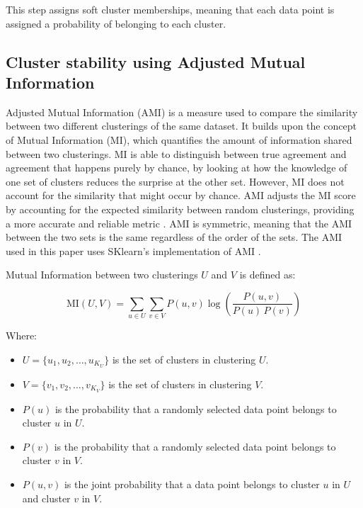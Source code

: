 \documentclass{article}
\begin{document}
This step assigns soft cluster memberships, meaning that each data point is assigned a probability of belonging to each cluster.


\subsection*{Cluster stability using  Adjusted Mutual Information}

Adjusted Mutual Information (AMI) is a measure used to compare the similarity between two different clusterings of the same dataset. It builds upon the concept of Mutual Information (MI), which quantifies the amount of information shared between two clusterings. MI is able to distinguish between true agreement and agreement that happens purely by chance, by looking at how the knowledge of one set of clusters reduces the surprise at the other set.
However, MI does not account for the similarity that might occur by chance. AMI adjusts the MI score by accounting for the expected similarity between random clusterings, providing a more accurate and reliable metric \cite{JMLR:v11:vinh10a}. 
AMI is symmetric, meaning that the AMI between the two sets is the same regardless of the order of the sets. The AMI used in this paper uses SKlearn's implementation of AMI \cite{Adjusted_mutual_info_score}.

Mutual Information between two clusterings \( U \) and \( V \) is defined as:

\[
\text{MI}(U, V) = \sum_{u \in U} \sum_{v \in V} P(u, v) \log \left( \frac{P(u, v)}{P(u) \, P(v)} \right)
\]

Where:
\begin{itemize}
    \item \( U = \{u_1, u_2, \dots, u_{K_U}\} \) is the set of clusters in clustering \( U \).
    \item \( V = \{v_1, v_2, \dots, v_{K_V}\} \) is the set of clusters in clustering \( V \).
    \item \( P(u) \) is the probability that a randomly selected data point belongs to cluster \( u \) in \( U \).
    \item \( P(v) \) is the probability that a randomly selected data point belongs to cluster \( v \) in \( V \).
    \item \( P(u, v) \) is the joint probability that a data point belongs to cluster \( u \) in \( U \) and cluster \( v \) in \( V \).
\end{itemize}
\end{document}
